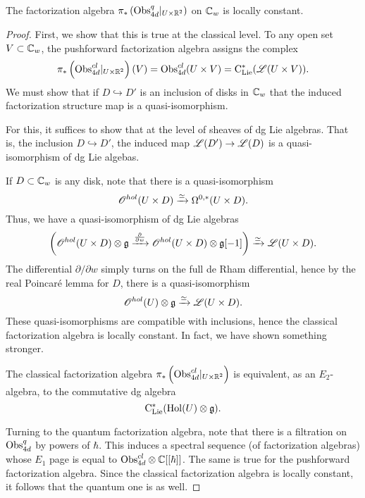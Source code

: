 \documentclass[11pt]{amsart}
\begin{document}
\begin{lem}
The factorization algebra $\pi_*\left({\rm Obs}^q_{4d}|_{U \times \mathbb R^2}\right)$ on $\mathbb C_w$ is locally constant. 
\end{lem}
\begin{proof}
First, we show that this is true at the classical level. 
To any open set $V \subset \mathbb C_w$, the pushforward factorization algebra assigns the complex
\[
\pi_*\left({\rm Obs}^{cl}_{4d}|_{U \times \mathbb R^2}\right) (V) = {\rm Obs}^{cl}_{4d}(U \times V) = {\rm C}_{{\rm Lie}}^*(\mathscr L(U \times V)) .
\]
We must show that if $D \hookrightarrow D'$ is an inclusion of disks in $\mathbb C_w$ that the induced factorization structure map is a quasi-isomorphism. 

For this, it suffices to show that at the level of sheaves of dg Lie algebras. 
That is, the inclusion $D \hookrightarrow D'$, the induced map $\mathscr L(D') \to \mathscr L(D)$ is a quasi-isomorphism of dg Lie algebas. 

If $D \subset \mathbb C_w$ is any disk, note that there is a quasi-isomorphism 
\[
\mathscr O^{hol}(U \times D) \xrightarrow{\simeq} \Omega^{0,*}(U \times D) .
\]
Thus, we have a quasi-isomorphism of dg Lie algebras 
\[
 \left (\mathscr O^{hol}(U \times D) \otimes \mathfrak g \xrightarrow{\frac{\partial}{\partial w}} \mathscr O^{hol}(U \times D) \otimes \mathfrak g [-1] \right) \xrightarrow{\simeq} \mathscr L(U \times D) .
 \]
The differential $\partial / \partial w$ simply turns on the full de Rham differential, hence by the real Poincar\'{e} lemma for $D$, there is a quasi-isomorphism
\[
\mathscr O^{hol}(U) \otimes \mathfrak g \xrightarrow{\simeq} \mathscr L(U \times D) .
\]
These quasi-isomorphisms are compatible with inclusions, hence the classical factorization algebra is locally constant.
In fact, we have shown something stronger.
\begin{lem}
The classical factorization algebra $\pi_*\left({\rm Obs}^{cl}_{4d}|_{U \times \mathbb R^2}\right)$ is equivalent, as an $E_2$-algebra, to the commutative dg algebra
\[
{\rm C}_{{\rm Lie}}^*({\rm Hol}(U)\otimes \mathfrak g) .
\] 
\end{lem}

Turning to the quantum factorization algebra, note that there is a filtration on ${\rm Obs}^q_{4d}$ by powers of $\hbar$. 
This induces a spectral sequence (of factorization algebras) whose $E_1$ page is equal to ${\rm Obs}^{cl}_{4d} \otimes \mathbb C[[\hbar]]$. 
The same is true for the pushforward factorization algebra. 
Since the classical factorization algebra is locally constant, it follows that the quantum one is as well. 

\end{proof}
\end{document}
